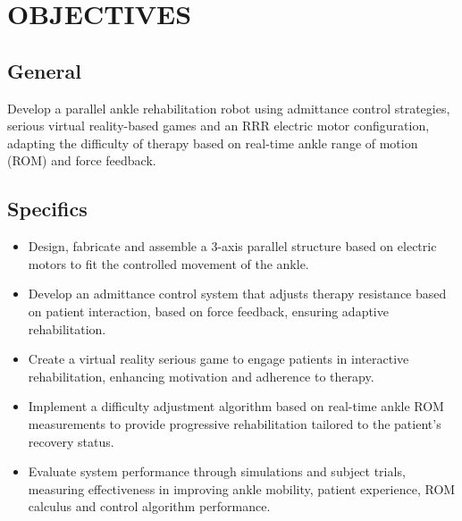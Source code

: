 \chapter{OBJECTIVES}

\section{General}

Develop a parallel ankle rehabilitation robot using admittance control strategies, serious virtual reality-based games and an RRR electric motor configuration, adapting the difficulty of therapy based on real-time ankle range of motion (ROM) and force feedback.

\section{Specifics}
\begin{itemize}
    \item Design, fabricate and assemble a 3-axis parallel structure based on electric motors to fit the controlled movement of the ankle.
    \item Develop an admittance control system that adjusts therapy resistance based on patient interaction, based on force feedback, ensuring adaptive rehabilitation.
    \item Create a virtual reality serious game to engage patients in interactive rehabilitation, enhancing motivation and adherence to therapy.
    \item Implement a difficulty adjustment algorithm based on real-time ankle ROM measurements to provide progressive rehabilitation tailored to the patient's recovery status.
    \item Evaluate system performance through simulations and subject trials, measuring effectiveness in improving ankle mobility, patient experience, ROM calculus and control algorithm performance. 

\end{itemize}
     
    